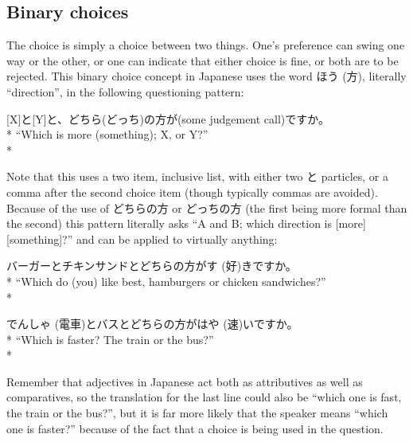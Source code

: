 \documentclass[11pt, b5paper, twoside, openright, onecolumn]{book}
\makeatletter
\newcommand*{\rubystack}[2]{{\relscale{0.5}%
  \begin{tabular}[b]{@{}c@{}}%
    {#1}\\%
   {\textscale{2}{#2}}%
  \end{tabular}}%
}
\DeclareRobustCommand*{\ruby}[2]{%
  \mbox{%
    \setlength{\parskip}{0ex}%
    \BeginAccSupp{method=pdfstringdef,ActualText={#1}}%
      \rubystack{\phantom{#2}}{#1}%
      \llap{%
        \rubystack{#2}{\phantom{#1}}%
      }%
    \EndAccSupp{}%
  }%
}
\renewcommand*{\ruby}[2]{#2 (#1)}%
\newenvironment{exampleblock}{
\setlength{\parindent}{0.6in}
\begin{minipage}[t]{\dimexpr\textwidth-\parindent}}
{\end{minipage}}
\makeatother
\begin{document}
\subsection{Binary choices}

The  choice is simply a choice between two things. One’s preference can swing one way or the other‚ or one can indicate that either choice is fine‚ or both are to be rejected. This binary choice concept in Japanese uses the word \ruby{方}{ほう}‚ literally “direction”‚ in the following questioning pattern:

\vspace{0.4cm}
\begin{exampleblock}
[X]と[Y]と、どちら(どっち)の方が(some judgement call)ですか。 \\* 
“Which is more (something); X‚ or Y?” \\* 
\end{exampleblock}
\vspace{0.2cm}

Note that this uses a two item‚ inclusive list‚ with either two と particles‚ or a comma after the second choice item (though typically commas are avoided). Because of the use of どちらの方 or どっちの方 (the first being more formal than the second) this pattern literally asks “A and B; which direction is [more] [something]?” and can be applied to virtually anything:

\vspace{0.4cm}
\begin{exampleblock}
バーガーとチキンサンドとどちらの方が\ruby{好}{す}きですか。 \\* 
“Which do (you) like best‚ hamburgers or chicken sandwiches?” \\* 
\end{exampleblock}
\vspace{0.2cm}

\begin{exampleblock}
\ruby{電車}{でんしゃ}とバスとどちらの方が\ruby{速}{はや}いですか。 \\* 
“Which is faster? The train or the bus?” \\* 
\end{exampleblock}
\vspace{0.2cm}

Remember that adjectives in Japanese act both as attributives as well as comparatives‚ so the translation for the last line could also be “which one is fast‚ the train or the bus?”‚ but it is far more likely that the speaker means “which one is faster?” because of the fact that a choice is being used in the question.
\end{document}
